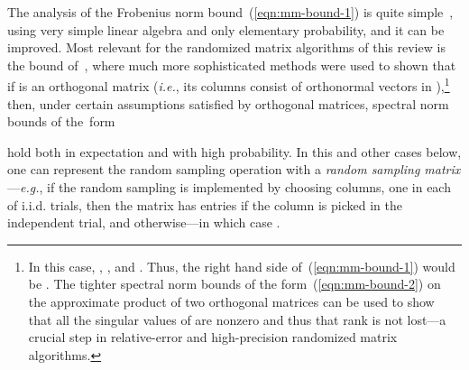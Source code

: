 \documentclass[twoside]{article}
\begin{document}
The analysis of the Frobenius norm bound~(\ref{eqn:mm-bound-1}) is quite 
simple~\cite{dkm_matrix1}, using very simple linear algebra and only 
elementary probability, and it can be improved.
Most relevant for the randomized matrix algorithms of this review is the 
bound of~\cite{Rud99,RV07}, where much more sophisticated methods were used 
to shown that if  is an  orthogonal matrix  
(\emph{i.e.}, its  columns consist of  orthonormal vectors in 
),\footnote{In this case, , , and .  
Thus, the right hand side of~(\ref{eqn:mm-bound-1}) would be 
.
The tighter spectral norm bounds of the form~(\ref{eqn:mm-bound-2}) on the 
approximate product of two orthogonal matrices can be used to show that all 
the singular values of  are nonzero and thus that rank 
is not lost---a crucial step in relative-error and high-precision 
randomized matrix algorithms.}
then, under certain assumptions satisfied by orthogonal matrices, spectral 
norm bounds of the~form 

hold both in expectation and with high probability.
In this and other cases below, one can represent the random sampling operation 
with a \emph{random sampling matrix} ---\emph{e.g.}, if the random 
sampling is implemented by choosing  columns, one in each of  i.i.d. trials, then the  matrix 
 has entries  if the 
column is picked in the  independent trial, and  
otherwise---in which case .
\end{document}
